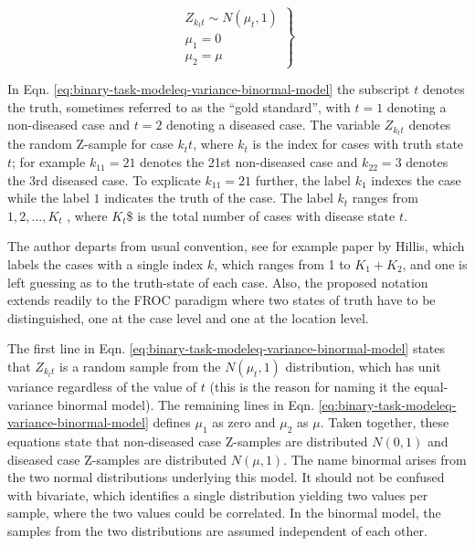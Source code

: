 \documentclass[
]{book}
\begin{document}
\begin{equation} 
\left.\begin{matrix}
Z_{k_tt} \sim N(\mu_t,1) \\ 
\mu_1=0\\ 
\mu_2=\mu
\end{matrix}\right\}
\label{eq:binary-task-modeleq-variance-binormal-model}
\end{equation}

In Eqn. \eqref{eq:binary-task-modeleq-variance-binormal-model} the subscript \(t\) denotes the truth, sometimes referred to as the ``gold standard'', with \(t = 1\) denoting a non-diseased case and \(t = 2\) denoting a diseased case. The variable \(Z_{k_tt}\) denotes the random Z-sample for case \(k_tt\), where \(k_t\) is the index for cases with truth state \(t\); for example \(k_11=21\) denotes the 21st non-diseased case and \(k_22=3\) denotes the 3rd diseased case. To explicate \(k_11=21\) further, the label \(k_1\) indexes the case while the label \(1\) indicates the truth of the case. The label \(k_t\) ranges from \(1,2,...,K_t\) , where \(K_t\)\$ is the total number of cases with disease state \(t\).

The author departs from usual convention, see for example paper by Hillis, which labels the cases with a single index \(k\), which ranges from 1 to \(K_1+K_2\), and one is left guessing as to the truth-state of each case. Also, the proposed notation extends readily to the FROC paradigm where two states of truth have to be distinguished, one at the case level and one at the location level.

The first line in Eqn. \eqref{eq:binary-task-modeleq-variance-binormal-model} states that \(Z_{k_tt}\) is a random sample from the \(N(\mu_t,1)\) distribution, which has unit variance regardless of the value of \(t\) (this is the reason for naming it the equal-variance binormal model). The remaining lines in Eqn. \eqref{eq:binary-task-modeleq-variance-binormal-model} defines \(\mu_1\) as zero and \(\mu_2\) as \(\mu\). Taken together, these equations state that non-diseased case Z-samples are distributed \(N(0,1)\) and diseased case Z-samples are distributed \(N(\mu,1)\). The name binormal arises from the two normal distributions underlying this model. It should not be confused with bivariate, which identifies a single distribution yielding two values per sample, where the two values could be correlated. In the binormal model, the samples from the two distributions are assumed independent of each other.
\end{document}
